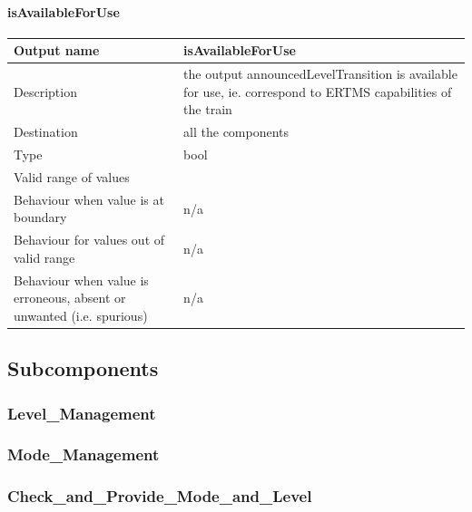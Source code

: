 \paragraph{isAvailableForUse}

\begin{longtable}{p{}p{}}
\toprule
Output name				& isAvailableForUse \\
\midrule
Description				& the output announcedLevelTransition is available for use, ie. correspond to ERTMS capabilities of the train \\
\midrule
Destination				& all the components \\ 
\midrule
Type					& bool \\
\midrule
Valid range of values	&  \\
\midrule
Behaviour when value is at boundary	& n/a \\ 
\midrule
Behaviour for values out of valid range	& n/a \\ 
\midrule
Behaviour when value is erroneous, absent or unwanted (i.e. spurious) & n/a \\
\bottomrule
\end{longtable}



\subsection{Subcomponents}\label{s:mdoe_and_level_subcomponents}

\subsubsection{Level\_Management}


\subsubsection{Mode\_Management}


\subsubsection{Check\_and\_Provide\_Mode\_and\_Level}



